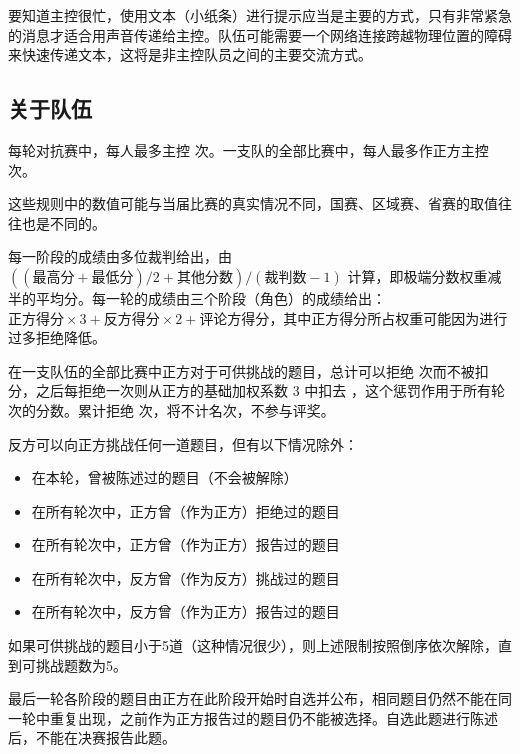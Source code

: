 \documentclass[a4paper,10pt,english]{sphinxmanual}
\begin{document}
要知道主控很忙，使用文本（小纸条）进行提示应当是主要的方式，只有非常紧急的消息才适合用声音传递给主控。队伍可能需要一个网络连接跨越物理位置的障碍来快速传递文本，这将是非主控队员之间的主要交流方式。


\subsection{关于队伍}
\label{\detokenize{6. Tournament:id8}}
每轮对抗赛中，每人最多主控  次。一支队的全部比赛中，每人最多作正方主控  次。%
\begin{footnote}[1]\sphinxAtStartFootnote
这些规则中的数值可能与当届比赛的真实情况不同，国赛、区域赛、省赛的取值往往也是不同的。
%
\end{footnote}

每一阶段的成绩由多位裁判给出，由 \(((\text{最高分}+\text{最低分})/2+\text{其他分数})/(\text{裁判数}-1)\) 计算，即极端分数权重减半的平均分。每一轮的成绩由三个阶段（角色）的成绩给出： \(\text{正方得分}\times 3+\text{反方得分}\times 2+\text{评论方得分}\)，其中正方得分所占权重可能因为进行过多拒绝降低。

在一支队伍的全部比赛中正方对于可供挑战的题目，总计可以拒绝  次而不被扣分，之后每拒绝一次则从正方的基础加权系数 3 中扣去  ，这个惩罚作用于所有轮次的分数。累计拒绝  次，将不计名次，不参与评奖。\sphinxfootnotemark[1]

反方可以向正方挑战任何一道题目，但有以下情况除外：
\begin{itemize}
\item {} 
在本轮，曾被陈述过的题目（不会被解除）

\item {} 
在所有轮次中，正方曾（作为正方）拒绝过的题目

\item {} 
在所有轮次中，正方曾（作为正方）报告过的题目

\item {} 
在所有轮次中，反方曾（作为反方）挑战过的题目

\item {} 
在所有轮次中，反方曾（作为正方）报告过的题目

\end{itemize}

如果可供挑战的题目小于5道（这种情况很少），则上述限制按照倒序依次解除，直到可挑战题数为5。

最后一轮各阶段的题目由正方在此阶段开始时自选并公布，相同题目仍然不能在同一轮中重复出现，之前作为正方报告过的题目仍不能被选择。自选此题进行陈述后，不能在决赛报告此题。
\end{document}
